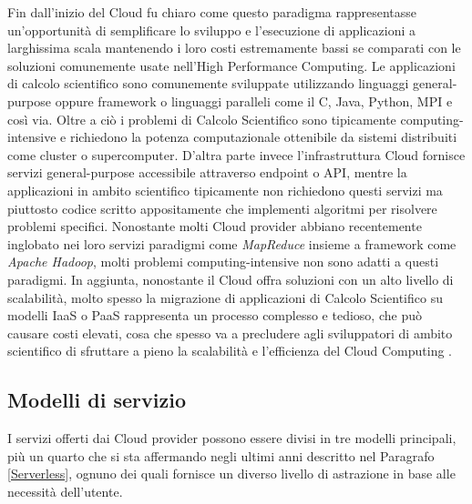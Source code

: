 Fin dall’inizio del Cloud fu chiaro come questo paradigma rappresentasse un’opportunità di semplificare lo sviluppo e l’esecuzione di applicazioni a larghissima scala mantenendo i loro costi estremamente bassi se comparati con le soluzioni comunemente usate nell’High Performance Computing. Le applicazioni di calcolo scientifico sono comunemente sviluppate utilizzando linguaggi general-purpose oppure framework o linguaggi paralleli come il C, Java, Python, MPI e così via. Oltre a ciò i problemi di Calcolo Scientifico sono tipicamente computing-intensive e richiedono la potenza computazionale ottenibile da sistemi distribuiti come cluster o supercomputer. D’altra parte invece l’infrastruttura Cloud fornisce servizi general-purpose accessibile attraverso endpoint o API, mentre la applicazioni in ambito scientifico tipicamente non richiedono questi servizi ma piuttosto codice scritto appositamente che implementi algoritmi per risolvere problemi specifici. Nonostante molti Cloud provider abbiano recentemente inglobato nei loro servizi paradigmi come \textit{MapReduce} insieme a framework come \textit{Apache Hadoop}, molti problemi computing-intensive non sono adatti a questi paradigmi. In aggiunta, nonostante il Cloud offra soluzioni con un alto livello di scalabilità, molto spesso la migrazione di applicazioni di Calcolo Scientifico su modelli IaaS o PaaS rappresenta un processo complesso e tedioso, che può causare costi elevati, cosa che spesso va a precludere agli sviluppatori di ambito scientifico di sfruttare a pieno la scalabilità e l’efficienza del Cloud Computing \cite{ISISLab}.

\subsection{Modelli di servizio}
I servizi offerti dai Cloud provider possono essere divisi in tre modelli principali, più un quarto che si sta affermando negli ultimi anni descritto nel Paragrafo \ref{Serverless}, ognuno dei quali fornisce un diverso livello di astrazione in base alle necessità dell'utente.

